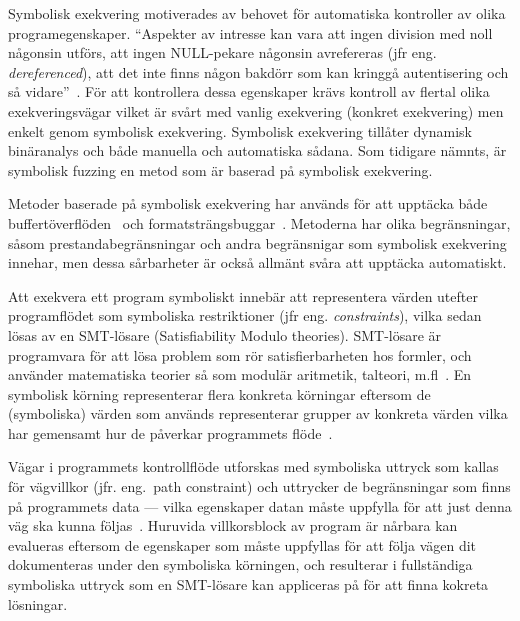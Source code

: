 


Symbolisk exekvering motiverades av behovet för automatiska kontroller av olika
programegenskaper. ``Aspekter av intresse kan vara att ingen division med
noll någonsin utförs, att ingen NULL-pekare någonsin avrefereras (jfr eng.
\emph{dereferenced}), att det inte finns någon bakdörr som kan kringgå
autentisering och så vidare''~\cite{survey_symb_exc}. För att kontrollera dessa
egenskaper krävs kontroll av flertal olika exekveringsvägar vilket är svårt med
vanlig exekvering (konkret exekvering) men enkelt genom symbolisk exekvering.
Symbolisk exekvering tillåter dynamisk binäranalys och både manuella och
automatiska sådana. Som tidigare nämnts, är symbolisk fuzzing en metod som är baserad på symbolisk
exekvering.


Metoder baserade på symbolisk exekvering har används för att upptäcka både
buffertöverflöden~\cite{bofaeg} och formatsträngsbuggar~\cite{vakkaupad15}.
Metoderna har olika begränsningar, såsom prestandabegränsningar och andra
begränsnigar som symbolisk exekvering innehar, men dessa sårbarheter är också
allmänt svåra att upptäcka automatiskt.

Att exekvera ett program symboliskt innebär att representera värden utefter
programflödet som symboliska restriktioner (jfr eng. \emph{constraints}), vilka sedan
lösas av en SMT-lösare (Satisfiability Modulo theories). SMT-lösare är programvara för att
lösa problem som rör satisfierbarheten hos formler, och använder matematiska teorier så
som modulär aritmetik, talteori, m.fl~\cite{symqemu}. %
En symbolisk körning representerar flera konkreta körningar eftersom de (symboliska) värden som
används representerar grupper av konkreta värden vilka har gemensamt hur de
påverkar programmets flöde~\cite{klee}.

Vägar i programmets kontrollflöde utforskas med symboliska uttryck som kallas
för vägvillkor (jfr. eng.\ path constraint) och uttrycker de begränsningar som finns på
programmets data --- vilka egenskaper datan måste uppfylla för att just denna väg
ska kunna följas~\cite{klee}. Huruvida villkorsblock av program är nårbara kan
evalueras eftersom de egenskaper som måste uppfyllas för att följa vägen dit dokumenteras
under den symboliska körningen, och resulterar i fullständiga symboliska uttryck som en
SMT-lösare kan appliceras på för att finna kokreta lösningar.

